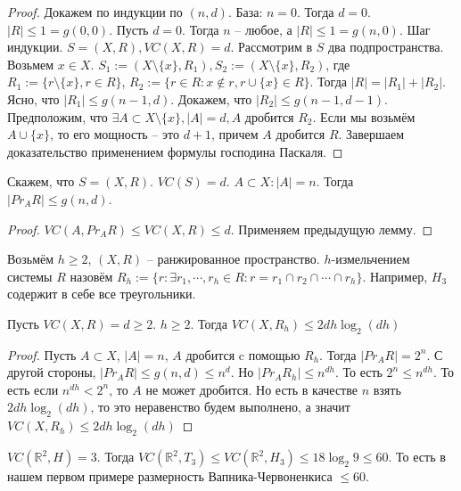 \documentclass[document.tex]{subfiles}
\begin{document}
\begin{proof}
    Докажем по индукции по $(n, d)$. База: $n = 0$. Тогда $d = 0$. $|R| \leq 1 = g(0, 0)$. Пусть $d = 0$. Тогда $n$ --
    любое, а $|R| \leq 1 = g(n, 0)$. Шаг индукции. $S = (X, R), VC(X, R) = d$. Рассмотрим в $S$ два подпространства.
    Возьмем $x \in X$. $S_1 := (X \setminus \{x\}, R_1), S_2 := (X \setminus \{x\}, R_2)$, где $R_1 := \{r \setminus \{x
    \}, r \in R\}$, $R_2 := \{r \in R: x \not \in r, r \cup \{x\} \in R\}$. Тогда $|R| = |R_1| + |R_2|$. Ясно, что
    $|R_1| \leq g(n
    - 1, d)$. Докажем, что $|R_2| \leq g(n - 1, d - 1)$. Предположим, что
    $\exists A \subset X \setminus \{x\}, |A| = d, A$ дробится
    $R_2$. Если мы возьмём $A \cup \{x\}$, то его мощность -- это $d+1$, причем $A$ дробится $R$. Завершаем
    доказательство применением формулы господина Паскаля.
\end{proof}

\begin{corollary}
    Скажем, что $S = (X, R)$. $VC(S) = d$. $A \subset X: |A| = n$. Тогда $|Pr_A R| \leq g(n, d)$.
\end{corollary}

\begin{proof}
    $VC(A, Pr_A R) \leq VC(X, R) \leq d$. Применяем предыдущую лемму.
\end{proof}

\begin{definition}
    Возьмём $h \geq 2$, $(X, R)$ -- ранжированное пространство. $h$-измельчением системы $R$ назовём $R_h := \{r:
    \exists r_1, \cdots, r_h \in  R: r = r_1 \cap r_2 \cap \cdots \cap r_h\}$. Например, $H_3$ содержит в себе все
    треугольники.
\end{definition}

\begin{lemma}
    Пусть $VC(X, R) = d \geq 2$. $h \geq 2$. Тогда $VC(X, R_h) \leq 2dh \log_2 (dh)$
\end{lemma}

\begin{proof}
    Пусть $A \subset X$, $|A| = n$, $A$ дробится c помощью $R_h$.
    Тогда $|Pr_A R| = 2^n$. С другой стороны, $|Pr_A R| \leq g(n, d) \leq
    n^d$. Но $|Pr_A R_h| \leq n^{dh}$. То есть $2^n \leq n^{dh}$. То есть если $n^{dh} < 2^n$, то $A$ не может дробится.
    Но есть в качестве $n$ взять $2dh \log_2 (dh)$, то это неравенство будем выполнено, а значит $VC(X, R_h) \leq 2dh
    \log_2 (dh)$
\end{proof}

\begin{example}
    $VC(\mathbb{R}^2, H) = 3$. Тогда $VC(\mathbb{R}^2, T_3) \leq VC(\mathbb{R}^2, H_3) \leq 18 \log_2 9 \leq 60$. То
    есть в нашем первом примере размерность Вапника-Червоненкиса $\leq 60$.
\end{example}
\end{document}

